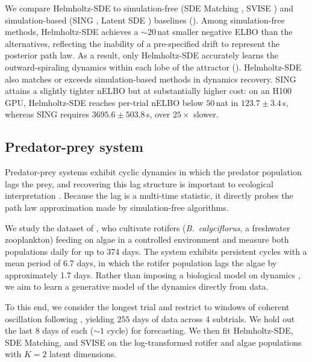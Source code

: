 We compare Helmholtz-SDE to simulation-free (SDE Matching \cite{bartosh2025sde}, SVISE \cite{course2023state,course2023amortized}) and simulation-based (SING \cite{hu2025sing}, Latent SDE \cite{li2020scalable}) baselines (). 
Among simulation-free methods, Helmholtz-SDE achieves a ${\sim}20$\,nat smaller negative ELBO than the alternatives, reflecting the inability of a pre-specified drift to represent the posterior path law. 
As a result, only Helmholtz-SDE accurately learns the outward-spiraling dynamics within each lobe of the attractor (). 
Helmholtz-SDE also matches or exceeds simulation-based methods in dynamics recovery. 
SING attains a slightly tighter nELBO but at substantially higher cost: on an H100 GPU, Helmholtz-SDE reaches per-trial nELBO below $50$\,nat in $123.7 \pm 3.4$\,s, whereas SING requires $3695.6 \pm 503.8$\,s, over $25\times$ slower.

\subsection{Predator-prey system}\label{subsec:predator-prey}
Predator-prey systems exhibit cyclic dynamics in which the predator population lags the prey, and recovering this lag structure is important to ecological interpretation \cite{lotka1925elements,volterra1926fluctuations,elton1942ten,utida1957cyclic,berryman2002population}.
Because the lag is a multi-time statistic, it directly probes the path law approximation made by simulation-free algorithms.

We study the dataset of \citet{blasius2020long}, who cultivate rotifers (\textit{B.~calyciflorus}, a freshwater zooplankton) feeding on algae in a controlled environment and measure both populations daily for up to 374 days. 
The system exhibits persistent cycles with a mean period of 6.7 days, in which the rotifer population lags the algae by approximately 1.7 days. 
Rather than imposing a biological model on dynamics \cite{mccauley1996structured}, we aim to learn a generative model of the dynamics directly from data.

To this end, we consider the longest trial and restrict to windows of coherent oscillation following \citet{blasius2020long}, yielding $255$ days of data across $4$ subtrials. We hold out the last $8$ days of each (${\sim}1$ cycle) for forecasting. 
We then fit Helmholtz-SDE, SDE Matching, and SVISE on the log-transformed rotifer and algae populations with $K{=}2$ latent dimensions. 

